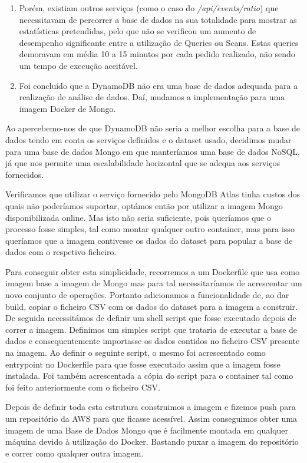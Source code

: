 \documentclass[11pt,a4paper]{article}
\begin{document}
\begin{enumerate}
	\item Porém, existiam outros serviços (como o caso do \textit{/api/events/ratio}) que necessitavam de percorrer a base de dados na sua totalidade para mostrar as estatísticas pretendidas, pelo que não se verificou um aumento de desempenho significante entre a utilização de Queries ou Scans. Estas queries demoravam em média 10 a 15 minutos por cada pedido realizado, não sendo um tempo de execução aceitável.
	
	\item Foi concluído que a DynamoDB não era uma base de dados adequada para a realização de análise de dados. Daí, mudamos a implementação para uma imagem Docker de Mongo.
\end{enumerate}

Ao apercebemo-nos de que DynamoDB não seria a melhor escolha para a base de dados tendo em conta os serviços definidos e o dataset usado, decidimos mudar para uma base de dados Mongo em que manteríamos uma base de dados NoSQL, já que nos permite uma escalabilidade horizontal que se adequa aos serviços fornecidos.

Verificamos que utilizar o serviço fornecido pelo MongoDB Atlas tinha custos dos quais não poderíamos suportar, optámos então por utilizar a imagem Mongo disponibilizada online. Mas isto não seria suficiente, pois queríamos que o processo fosse simples, tal como montar qualquer outro container, mas para isso queríamos que a imagem contivesse os dados do dataset para popular a base de dados com o respetivo ficheiro. 

Para conseguir obter esta simplicidade, recorremos a um Dockerfile que usa como imagem base a imagem de Mongo mas para tal necessitaríamos de acrescentar um novo conjunto de operações. Portanto adicionamos a funcionalidade de, ao dar build, copiar o ficheiro CSV com os dados do dataset para a imagem a construir. De seguida necessitámos de definir um shell script que fosse executado depois de correr a imagem. Definimos um simples script que trataria de executar a base de dados e consequentemente importasse os dados contidos no ficheiro CSV presente na imagem. Ao definir o seguinte script, o mesmo foi acrescentado como entrypoint no Dockerfile para que fosse executado assim que a imagem fosse instalada. Foi também acrescentada a cópia do script para o container tal como foi feito anteriormente com o ficheiro CSV.

Depois de definir toda esta estrutura construimos a imagem e fizemos push para um repositório da AWS para que ficasse acessível. Assim conseguimos obter uma imagem de uma Base de Dados Mongo que é facilmente montada em qualquer máquina devido à utilização do Docker. Bastando puxar a imagem do repositório e correr como qualquer outra imagem.
\end{document}
